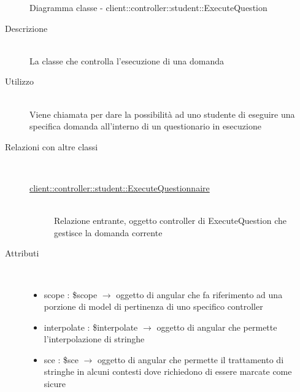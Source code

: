 \vspace{0.5cm}
\hypertarget{client::controller::student::ExecuteQuestion}{}
\begin{figure}[H]
	\centering
	\caption{Diagramma classe - client::controller::student::ExecuteQuestion}
\end{figure}\begin{description}
\item[Descrizione] \hfill \\
La classe che controlla l'esecuzione di una domanda 
\item[Utilizzo] \hfill \\
Viene chiamata per dare la possibilità ad uno studente di eseguire una specifica domanda all'interno di un questionario in esecuzione
\item[Relazioni con altre classi] \hfill \\
\vspace{-7mm}
\begin{description}
	\item[\hyperlink{client::controller::student::ExecuteQuestionnaire}{client::controller::student::ExecuteQuestionnaire}] \hfill \\
	Relazione entrante, oggetto controller di ExecuteQuestion che gestisce la domanda corrente
\end{description}

\item[Attributi] \hfill \\
\vspace{-7mm}
\begin{itemize}
	\item scope : \$scope $\rightarrow$ oggetto di angular che fa riferimento ad una porzione di model di pertinenza di uno specifico controller
	\item interpolate : \$interpolate $\rightarrow$ oggetto di angular che permette l'interpolazione di stringhe
	\item sce : \$sce $\rightarrow$ oggetto di angular che permette il trattamento di stringhe in alcuni contesti dove richiedono di essere marcate come sicure
\end{itemize}


\end{description}
